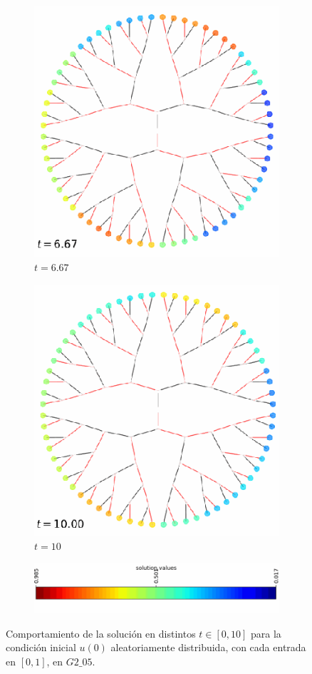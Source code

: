 \begin{figure}
\begin{subfigure}{.5\textwidth}
		\centering
		\includegraphics[width=.8\linewidth]{img/solutions/random_2}
		\caption{$t=6.67$}
		\label{fig:sfig1}
	\end{subfigure}%
	\begin{subfigure}{.5\textwidth}
		\centering
		\includegraphics[width=.8\linewidth]{img/solutions/random_3}
		\caption{$t=10$}
		\label{fig:sfig1}
	\end{subfigure}
	\begin{subfigure}{1.05\textwidth}
		\centering
		\includegraphics[width=.8\linewidth]{img/solutions/random_bar}
		\label{fig:sfig1}
	\end{subfigure}%
	\caption{Comportamiento de la solución en distintos $t\in[0,10]$ para la condición inicial $u(0)$ aleatoriamente distribuida, con cada entrada en $[0,1]$, en $\mathit{G2\_05}$.}
	\label{IC-random}
\end{figure}

